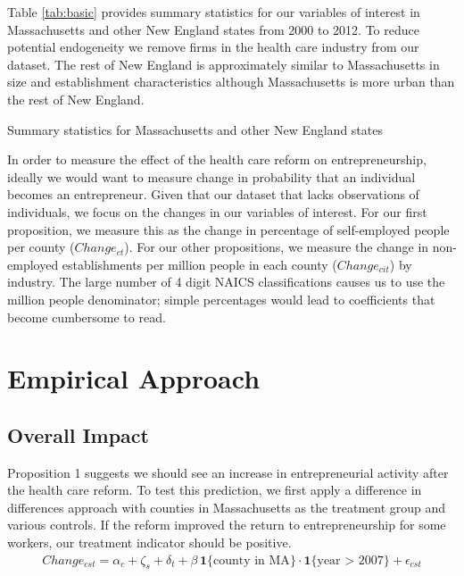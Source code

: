 Table \ref{tab:basic} provides summary statistics for our variables of interest in Massachusetts and other New England states from 2000 to 2012. To reduce potential endogeneity we remove firms in the health care industry from our dataset. The rest of New England is approximately similar to Massachusetts in size and establishment characteristics although Massachusetts is more urban than the rest of New England. 

\begin{table}[h]
	\centering
	\caption{Summary statistics for Massachusetts and other New England states}
	
	\label{tab:basic}
\end{table}

In order to measure the effect of the health care reform on entrepreneurship, ideally we would want to measure change in probability that an individual becomes an entrepreneur. Given that our dataset that lacks observations of individuals, we focus on the changes in our variables of interest. For our first proposition, we measure this as the change in percentage of self-employed people per county ($Change_{ct}$). For our other propositions, we measure the change in non-employed establishments per million people in each county ($Change_{cit}$) by industry. The large number of 4 digit NAICS classifications causes us to use the million people denominator; simple percentages would lead to coefficients that become cumbersome to read. 

\chapter{Empirical Approach}
\label{sec:regression}

\section{Overall Impact}

Proposition 1 suggests we should see an increase in entrepreneurial activity after the health care reform. To test this prediction, we first apply a difference in differences approach with counties in Massachusetts as the treatment group and various controls. If the reform improved the return to entrepreneurship for some workers, our treatment indicator should be positive. 
\begin{align}
Change_{cst} = \alpha_c + \zeta_s + \delta_t + \beta \, \mathbf{1}\{\text{county in MA}\} \cdot \mathbf{1}\{\text{year > 2007}\} + \epsilon_{cst}
\end{align}

